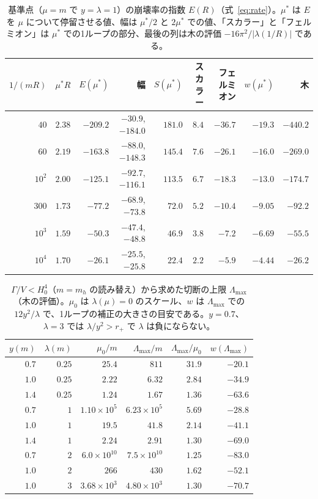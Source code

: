 \documentclass[a4paper,10pt]{ltjsarticle}
\begin{document}
\begin{table}[tbp]
\centering\small
\caption{基準点（$\mu=m$ で $y=\lambda=1$）の崩壊率の指数 $E(R)$（式~\eqref{eq:rate}）。$\mu^*$ は $E$ を $\mu$ について停留させる値、幅は $\mu^*/2$ と $2\mu^*$ での値、「スカラー」と「フェルミオン」は $\mu^*$ での1ループの部分、最後の列は木の評価 $-16\pi^2/|\lambda(1/R)|$ である。}
\label{tab:prefactor}
\setlength{\tabcolsep}{4pt}
\begin{tabular}{rrrrrrrrr}
\toprule
$1/(mR)$ & $\mu^*R$ & $E(\mu^*)$ & 幅 & $S(\mu^*)$ & スカラー & フェルミオン & $w(\mu^*)$ & 木 \\
\midrule
$40$ & $2.38$ & $-209.2$ & $-30.9$, $-184.0$ & $181.0$ & $8.4$ & $-36.7$ & $-19.3$ & $-440.2$ \\
$60$ & $2.19$ & $-163.8$ & $-88.0$, $-148.3$ & $145.4$ & $7.6$ & $-26.1$ & $-16.0$ & $-269.0$ \\
$10^2$ & $2.00$ & $-125.1$ & $-92.7$, $-116.1$ & $113.5$ & $6.7$ & $-18.3$ & $-13.0$ & $-174.7$ \\
$300$ & $1.73$ & $-77.2$ & $-68.9$, $-73.8$ & $72.0$ & $5.2$ & $-10.4$ & $-9.05$ & $-92.2$ \\
$10^3$ & $1.59$ & $-50.3$ & $-47.4$, $-48.8$ & $46.9$ & $3.8$ & $-7.2$ & $-6.69$ & $-55.5$ \\
$10^4$ & $1.70$ & $-26.1$ & $-25.5$, $-25.8$ & $22.4$ & $2.2$ & $-5.9$ & $-4.44$ & $-26.2$ \\
\bottomrule
\end{tabular}
\end{table}

\begin{table}[tbp]
\centering\small
\caption{$\Gamma/V<H_0^4$（$m=m_h$ の読み替え）から求めた切断の上限 $\Lambda_{\max}$（木の評価）。$\mu_0$ は $\lambda(\mu)=0$ のスケール、$w$ は $\Lambda_{\max}$ での $12y^2/\lambda$ で、1ループの補正の大きさの目安である。$y=0.7$、$\lambda=3$ では $\lambda/y^2>r_+$ で $\lambda$ は負にならない。}
\label{tab:lmax}
\setlength{\tabcolsep}{4pt}
\begin{tabular}{rrrrrr}
\toprule
$y(m)$ & $\lambda(m)$ & $\mu_0/m$ & $\Lambda_{\max}/m$ & $\Lambda_{\max}/\mu_0$ & $w(\Lambda_{\max})$ \\
\midrule
$0.7$ & $0.25$ & $25.4$ & $811$ & $31.9$ & $-20.1$ \\
$1.0$ & $0.25$ & $2.22$ & $6.32$ & $2.84$ & $-34.9$ \\
$1.4$ & $0.25$ & $1.24$ & $1.67$ & $1.36$ & $-63.6$ \\
$0.7$ & $1$ & $1.10\times10^5$ & $6.23\times10^5$ & $5.69$ & $-28.8$ \\
$1.0$ & $1$ & $19.5$ & $41.8$ & $2.14$ & $-41.1$ \\
$1.4$ & $1$ & $2.24$ & $2.91$ & $1.30$ & $-69.0$ \\
$0.7$ & $2$ & $6.0\times10^{10}$ & $7.5\times10^{10}$ & $1.25$ & $-83.0$ \\
$1.0$ & $2$ & $266$ & $430$ & $1.62$ & $-52.1$ \\
$1.0$ & $3$ & $3.68\times10^3$ & $4.80\times10^3$ & $1.30$ & $-70.7$ \\
\bottomrule
\end{tabular}
\end{table}
\end{document}
